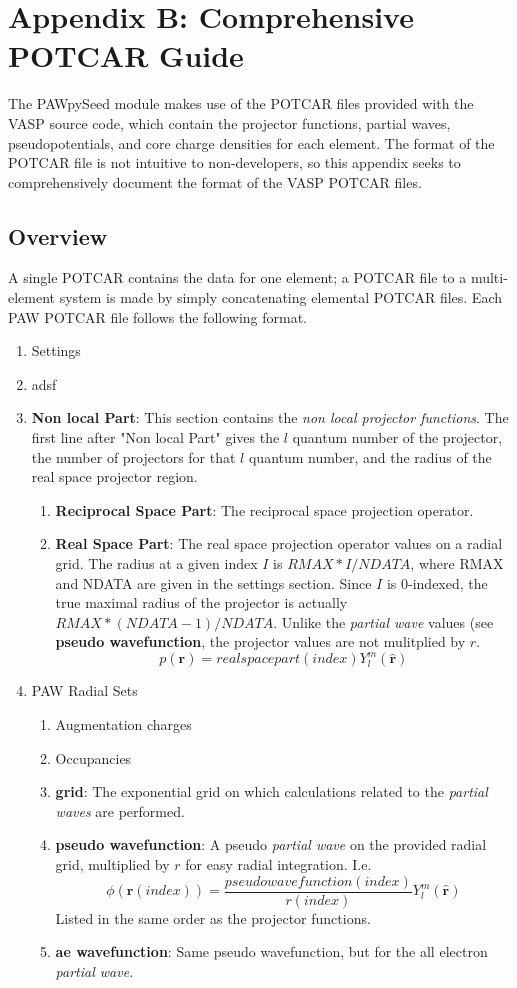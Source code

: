 \documentclass[12pt]{article}
\begin{document}
\section*{Appendix B: Comprehensive POTCAR Guide}
The PAWpySeed module makes use of the POTCAR files provided with the VASP source code, which
contain the projector functions, partial waves, pseudopotentials, and core charge densities
for each element. The format of the POTCAR file is not intuitive to non-developers, so this
appendix seeks to comprehensively document the format of the VASP POTCAR files.

\subsection*{Overview}
A single POTCAR contains the data for one element; a POTCAR file to a multi-element system
is made by simply concatenating elemental POTCAR files. Each PAW POTCAR file follows
the following format.

\begin{enumerate}
	\item
	Settings
	\item
	adsf
	\item
	\textbf{Non local Part}: This section contains the \emph{non local projector functions}.
	The first line after "Non local Part" gives the $l$ quantum number of the projector,
	the number of projectors for that $l$ quantum number, and the radius of the real
	space projector region.
	\begin{enumerate}
		\item
		\textbf{Reciprocal Space Part}: The reciprocal space projection operator.
		\item
		\textbf{Real Space Part}: The real space projection operator values on a radial
		grid. The radius at a given index $I$ is $RMAX*I/NDATA$, where RMAX and NDATA
		are given in the settings section. Since $I$ is 0-indexed, the true maximal
		radius of the projector is actually $RMAX*(NDATA-1)/NDATA$. Unlike the
		\emph{partial wave} values (see \textbf{pseudo wavefunction},
		the projector values are not mulitplied by $r$.
		$$p(\mathbf{r})=realspacepart(index)Y_l^m(\hat{\mathbf{r}})$$
	\end{enumerate}
	\item
	PAW Radial Sets
	\begin{enumerate}
		\item
		Augmentation charges
		\item
		Occupancies
		\item
		\textbf{grid}: The exponential grid on which calculations related
		to the \emph{partial waves} are performed.
		\item
		\textbf{pseudo wavefunction}: A pseudo \emph{partial wave} on the provided
		radial grid, multiplied by $r$ for easy radial integration. I.e.
		$$\phi(\mathbf{r}(index))=\frac{pseudowavefunction(index)}{r(index)}Y_l^m(\hat{\mathbf{r}})$$
		Listed in the same order as the projector functions.
		\item
		\textbf{ae wavefunction}: Same pseudo wavefunction, but for the all electron \emph{partial wave}.
	\end{enumerate}
\end{enumerate}

\subsection*{}

\printbibliography
\end{document}
